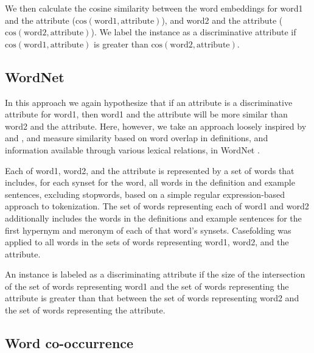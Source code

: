\documentclass[11pt,a4paper]{article}
\begin{document}
We then calculate the cosine similarity between the word embeddings
for word1 and the attribute
($\mathrm{cos}(\mathrm{word1},\mathrm{attribute})$), and word2 and the
attribute ($\mathrm{cos}(\mathrm{word2},\mathrm{attribute})$). We
label the instance as a discriminative attribute if
$\mathrm{cos}(\mathrm{word1},\mathrm{attribute})$ is greater than
$\mathrm{cos}(\mathrm{word2},\mathrm{attribute})$.


\subsection{WordNet\label{sec:wordnet}}



In this approach we again hypothesize that if an attribute is a
discriminative attribute for word1, then word1 and the attribute will
be more similar than word2 and the attribute. Here, however, we take
an approach loosely inspired by \cite{Lesk:1986} and
\citep{Banerjee:Pedersen:2002}, and measure similarity based on word
overlap in definitions, and information available through various
lexical relations, in WordNet \citep{Fellbaum1998}.

Each of word1, word2, and the attribute is represented by a set of
words that includes, for each synset for the word, all words in the
definition and example sentences, excluding stopwords, based on a
simple regular expression-based approach to tokenization. The set of
words representing each of word1 and word2 additionally includes the
words in the definitions and example sentences for the first hypernym
and meronym of each of that word's synsets. Casefolding was applied to
all words in the sets of words representing word1, word2, and the
attribute.


An instance is labeled as a discriminating attribute if the size of
the intersection of the set of words representing word1 and the set of
words representing the attribute is greater than that between the set
of words representing word2 and the set of words representing the
attribute.


\subsection{Word co-occurrence\label{sec:cooccurrence}}
\end{document}
